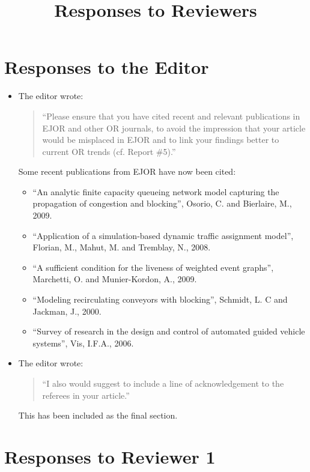 \documentclass{article}
\title{Responses to Reviewers}
\author{}
\date{}
\begin{document}
\maketitle

\section*{Responses to the Editor}

\begin{itemize}

\item The editor wrote:
\begin{quote}
``Please ensure that you have cited recent and relevant publications in EJOR
and other OR journals, to avoid the impression that your article would be
misplaced in EJOR and to link your findings better to current OR trends
(cf. Report \#5).''
\end{quote}
Some recent publications from EJOR have now been cited:
\begin{itemize}
\item ``An analytic finite capacity queueing network model capturing the
propagation of congestion and blocking'', Osorio, C. and Bierlaire, M., 2009.
\item ``Application of a simulation-based dynamic traffic assignment model'',
Florian, M., Mahut, M. and Tremblay, N., 2008.
\item ``A sufficient condition for the liveness of weighted event graphs'',
Marchetti, O. and Munier-Kordon, A., 2009.
\item ``Modeling recirculating conveyors with blocking'', Schmidt, L. C and
Jackman, J., 2000.
\item ``Survey of research in the design and control of automated guided
vehicle systems'', Vis, I.F.A., 2006.
\end{itemize}


\item The editor wrote:
\begin{quote}
``I also would suggest to include a line of acknowledgement to the referees
in your article.''
\end{quote}
This has been included as the final section.

\end{itemize}


\section*{Responses to Reviewer 1}
\end{document}

